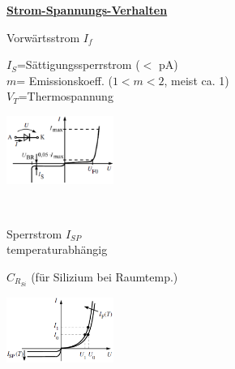             \underline{\bf Strom-Spannungs-Verhalten}\\
            \begin{minipage}[T]{8.5cm}
                Vorw\"artsstrom $I_f$
                \hspace{14.6mm}\\
            \end{minipage}
            \begin{minipage}{7cm}
                $I_S$=S\"attigungssperrstrom ($<$ pA)\\
                $m$= Emissionskoeff. ($1<m<2$, meist ca. 1)\\
                $V_T$=Thermospannung
            \end{minipage}
            \begin{minipage}{3.5cm}
                \includegraphics[width=3.5cm]{./bilder/IU_Kennlinie_Diode}\\
            \end{minipage}\\
            
            \begin{minipage}[T]{9.5cm}
                Sperrstrom $I_{SP}$
                \hspace{18mm}\\
                temperaturabh\"angig
                \hspace{11mm}\\
            \end{minipage}
            \begin{minipage}{6cm}
                $C_{R_{Si}}$ (f\"ur Silizium bei Raumtemp.)
            \end{minipage}
            \begin{minipage}{3.5cm}
                \includegraphics[width=3.5cm]{./bilder/IspKennlinieDiodeTemp}\\
            \end{minipage}\\
            
